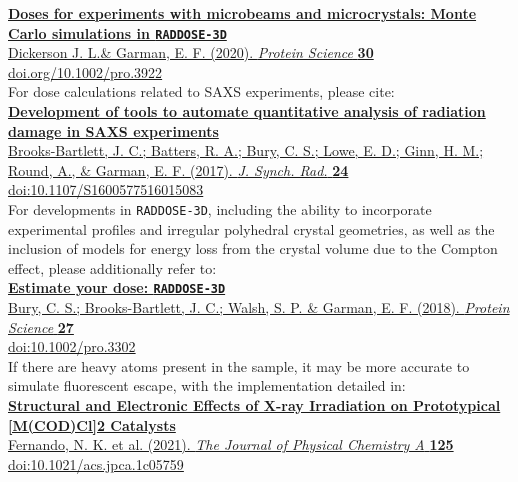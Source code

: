 \documentclass[a4paper]{article}
\newcommand{\RD}{\texttt{RADDOSE-3D}\xspace}
\begin{document}
\href{https://doi.org/10.1002/pro.3922}{\large\textbf{Doses for experiments with microbeams and microcrystals: Monte Carlo simulations in \RD}}\\[0.1em]
\href{https://doi.org/10.1002/pro.3922}{Dickerson J. L.\& Garman, E. F. (2020). \textit{Protein Science} \textbf{30} %
}\\[0.1em]
\href{https://doi.org/10.1002/pro.3922}{doi.org/10.1002/pro.3922}
\\[1.5em]
\noindent
For dose calculations related to SAXS experiments, please cite:\\[0.4em]
\href{https://doi.org/10.1107/S1600577516015083}{\large\textbf{Development of tools to automate quantitative analysis of radiation damage in SAXS experiments}}\\[0.1em]
\href{https://doi.org/10.1107/S1600577516015083}{Brooks-Bartlett, J. C.; Batters, R. A.; Bury, C. S.; Lowe, E. D.; Ginn, H. M.; Round, A., \& Garman, E. F. (2017). \textit{J. Synch. Rad.} \textbf{24} %
}\\[0.1em]
\href{https://doi.org/10.1107/S1600577516015083}{doi:10.1107/S1600577516015083}
\\[1.5em]
\noindent
For developments in \RD, including the ability to incorporate experimental profiles and irregular polyhedral crystal geometries, as well as the inclusion of  models for energy loss from the crystal volume due to the Compton effect, please additionally refer to:\\[0.4em]
\href{https://doi.org/10.1002/pro.3302}{\large\textbf{Estimate your dose: \RD}}\\[0.1em]
\href{https://doi.org/10.1002/pro.3302}{Bury, C. S.; Brooks-Bartlett, J. C.; Walsh, S. P. \& Garman, E. F. (2018). \textit{Protein Science} \textbf{27} %
}\\[0.1em]
\href{https://doi.org/10.1002/pro.3302}{doi:10.1002/pro.3302}
\\[1.5em]
\noindent
If there are heavy atoms present in the sample, it may be more accurate to simulate fluorescent escape, with the implementation detailed in:\\[0.4em]
\href{https://doi:10.1021/acs.jpca.1c05759}{\large\textbf{Structural and Electronic Effects of X-ray Irradiation on Prototypical [M(COD)Cl]2 Catalysts}}\\[0.1em]
\href{https://doi:10.1021/acs.jpca.1c05759}{Fernando, N. K. et al. (2021). \textit{The Journal of Physical Chemistry A} \textbf{125} %
}\\[0.1em]
\href{https://doi:10.1021/acs.jpca.1c05759}{doi:10.1021/acs.jpca.1c05759}
\\[1.5em]
\end{document}
